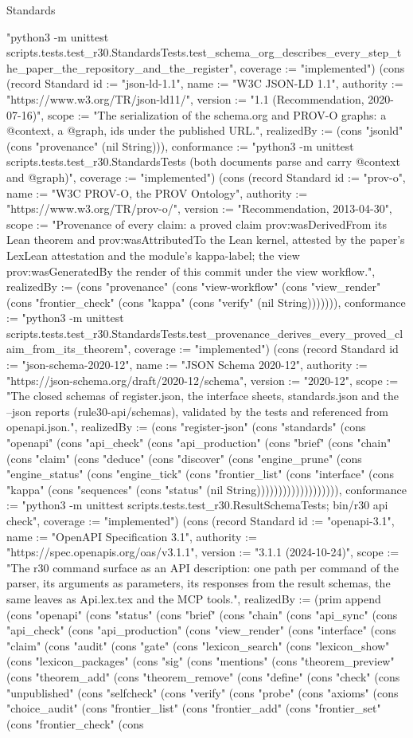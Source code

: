 \begin{lexlean}{Standards}
\begin{semanticmodule}
{"python3 -m unittest scripts.tests.test_r30.StandardsTests.test_schema_org_describes_every_step_the_paper_the_repository_and_the_register", coverage := "implemented"}) (cons (record Standard {id := "json-ld-1.1", name := "W3C JSON-LD 1.1", authority := "https://www.w3.org/TR/json-ld11/", version := "1.1 (Recommendation, 2020-07-16)", scope := "The serialization of the schema.org and PROV-O graphs: a @context, a @graph, ids under the published URL.", realizedBy := (cons "jsonld" (cons "provenance" (nil String))), conformance := "python3 -m unittest scripts.tests.test_r30.StandardsTests (both documents parse and carry @context and @graph)", coverage := "implemented"}) (cons (record Standard {id := "prov-o", name := "W3C PROV-O, the PROV Ontology", authority := "https://www.w3.org/TR/prov-o/", version := "Recommendation, 2013-04-30", scope := "Provenance of every claim: a proved claim prov:wasDerivedFrom its Lean theorem and prov:wasAttributedTo the Lean kernel, attested by the paper's LexLean attestation and the module's kappa-label; the view prov:wasGeneratedBy the render of this commit under the view workflow.", realizedBy := (cons "provenance" (cons "view-workflow" (cons "view_render" (cons "frontier_check" (cons "kappa" (cons "verify" (nil String))))))), conformance := "python3 -m unittest scripts.tests.test_r30.StandardsTests.test_provenance_derives_every_proved_claim_from_its_theorem", coverage := "implemented"}) (cons (record Standard {id := "json-schema-2020-12", name := "JSON Schema 2020-12", authority := "https://json-schema.org/draft/2020-12/schema", version := "2020-12", scope := "The closed schemas of register.json, the interface sheets, standards.json and the --json reports (rule30-api/schemas), validated by the tests and referenced from openapi.json.", realizedBy := (cons "register-json" (cons "standards" (cons "openapi" (cons "api_check" (cons "api_production" (cons "brief" (cons "chain" (cons "claim" (cons "deduce" (cons "discover" (cons "engine_prune" (cons "engine_status" (cons "engine_tick" (cons "frontier_list" (cons "interface" (cons "kappa" (cons "sequences" (cons "status" (nil String))))))))))))))))))), conformance := "python3 -m unittest scripts.tests.test_r30.ResultSchemaTests; bin/r30 api check", coverage := "implemented"}) (cons (record Standard {id := "openapi-3.1", name := "OpenAPI Specification 3.1", authority := "https://spec.openapis.org/oas/v3.1.1", version := "3.1.1 (2024-10-24)", scope := "The r30 command surface as an API description: one path per command of the parser, its arguments as parameters, its responses from the result schemas, the same leaves as Api.lex.tex and the MCP tools.", realizedBy := (prim append (cons "openapi" (cons "status" (cons "brief" (cons "chain" (cons "api_sync" (cons "api_check" (cons "api_production" (cons "view_render" (cons "interface" (cons "claim" (cons "audit" (cons "gate" (cons "lexicon_search" (cons "lexicon_show" (cons "lexicon_packages" (cons "sig" (cons "mentions" (cons "theorem_preview" (cons "theorem_add" (cons "theorem_remove" (cons "define" (cons "check" (cons "unpublished" (cons "selfcheck" (cons "verify" (cons "probe" (cons "axioms" (cons "choice_audit" (cons "frontier_list" (cons "frontier_add" (cons "frontier_set" (cons "frontier_check" (cons }
\end{semanticmodule}
\end{lexlean}
